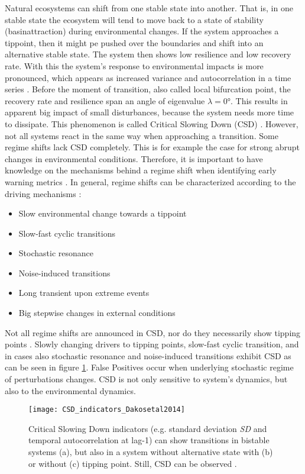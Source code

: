 Natural ecosystems can shift from one stable state into another. That is, in one stable state the ecosystem will tend to move back to a state of stability (\gls{basinattraction}) during environmental changes. If the system approaches a \gls{tippoint}, then it might pe pushed over the boundaries and shift into an alternative stable state. The system then shows low resilience and low recovery rate. With this the system's response to environmental impacts is more pronounced, which appears as increased variance and autocorrelation in a time series \citep{dakos2014}. Before the moment of transition, also called local bifurcation point, the recovery rate and \gls{resilience} span an angle of eigenvalue $\lambda = \ang{0}$. This results in apparent big impact of small disturbances, because the system needs more time to dissipate. This phenomenon is called Critical Slowing Down (CSD) \citep{dakos2014}. However, not all systems react in the same way when approaching a transition. Some regime shifts lack CSD completely. This is for example the case for strong abrupt changes in environmental conditions. Therefore, it is important to have knowledge on the mechanisms behind a regime shift when identifying early warning metrics \citep{dakos2014}. In general, regime shifts can be characterized according to the driving mechanisms \citep{dakos2014}:
	\begin{itemize}
		\item Slow environmental change towards a \gls{tippoint}
		\item Slow-fast cyclic transitions
		\item Stochastic resonance
		\item Noise-induced transitions
		\item Long transient upon extreme events
		\item Big stepwise changes in external conditions
	\end{itemize}
	
Not all regime shifts are announced in CSD, nor do they necessarily show tipping points \citep{dakos2014}. Slowly changing drivers to tipping points, slow-fast cyclic transition, and in cases also stochastic resonance and noise-induced transitions exhibit CSD as can be seen in figure \ref{fig:CSD_indics}. False Positives occur when underlying stochastic regime of perturbations changes. CSD is not only sensitive to system's dynamics, but also to the environmental dynamics.
	
\begin{figure}
	\centering
	\texttt{[image: CSD\_indicators\_Dakosetal2014]}
	\caption{Critical Slowing Down indicators (e.g. standard deviation \textit{SD} and temporal autocorrelation at lag-1) can show transitions in bistable systems (a), but also in a system without alternative state with (b) or without (c) tipping point. Still, CSD can be observed \citep{dakos2014}.}\label{fig:CSD_indics}
\end{figure}	


